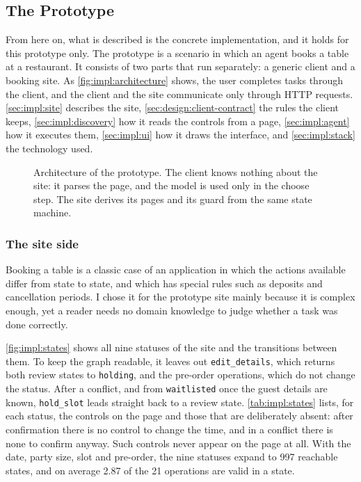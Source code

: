 \FloatBarrier

\subsection{The Prototype}\label{sec:impl:prototype}

From here on, what is described is the concrete implementation, and it holds for this prototype only.
The prototype is a scenario in which an agent books a table at a restaurant.
It consists of two parts that run separately: a generic client and a booking site.
As \autoref{fig:impl:architecture} shows, the user completes tasks through the client, and the client and the site communicate only through HTTP requests.
\autoref{sec:impl:site} describes the site, \autoref{sec:design:client-contract} the rules the client keeps, \autoref{sec:impl:discovery} how it reads the controls from a page, \autoref{sec:impl:agent} how it executes them, \autoref{sec:impl:ui} how it draws the interface, and \autoref{sec:impl:stack} the technology used.

\begin{figure}[htbp]
\centering

\caption{Architecture of the prototype. The client knows nothing about the site: it parses the page, and the model is used only in the choose step. The site derives its pages and its guard from the same state machine.}
\label{fig:impl:architecture}
\end{figure}

\subsubsection{The site side}\label{sec:impl:site}

Booking a table is a classic case of an application in which the actions available differ from state to state, and which has special rules such as deposits and cancellation periods.
I chose it for the prototype site mainly because it is complex enough, yet a reader needs no domain knowledge to judge whether a task was done correctly.

\autoref{fig:impl:states} shows all nine statuses of the site and the transitions between them.
To keep the graph readable, it leaves out \texttt{edit\_details}, which returns both review states to \texttt{holding}, and the pre-order operations, which do not change the status.
After a conflict, and from \texttt{waitlisted} once the guest details are known, \texttt{hold\_slot} leads straight back to a review state.
\autoref{tab:impl:states} lists, for each status, the controls on the page and those that are deliberately absent: after confirmation there is no control to change the time, and in a conflict there is none to confirm anyway.
Such controls never appear on the page at all.
With the date, party size, slot and pre-order, the nine statuses expand to 997 reachable states, and on average 2.87 of the 21 operations are valid in a state.

